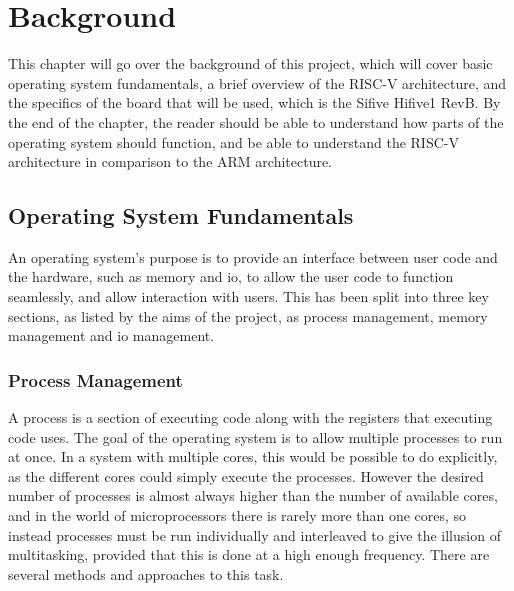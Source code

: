 \chapter[Background]{Background}
\label{cha:backgr}
This chapter will go over the background of this project, which will cover basic operating system fundamentals, a brief overview of the RISC-V architecture, and the specifics of the board that will be used, which is the Sifive Hifive1 RevB. By the end of the chapter, the reader should be able to understand how parts of the operating system should function, and be able to understand the RISC-V architecture in comparison to the ARM architecture.
\section{Operating System Fundamentals}
An operating system's purpose is to provide an interface between user code and the hardware, such as memory and \ac{io}, to allow the user code to function seamlessly, and allow interaction with users. This has been split into three key sections, as listed by the aims of the project, as process management, memory management and \ac{io} management\cite{modern_operating}.
\subsection{Process Management}
A process is a section of executing code along with the registers that executing code uses. The goal of the operating system is to allow multiple processes to run at once. In a system with multiple cores, this would be possible to do explicitly, as the different cores could simply execute the processes. However the desired number of processes is almost always higher than the number of available cores, and in the world of microprocessors there is rarely more than one cores, so instead processes must be run individually and interleaved to give the illusion of multitasking, provided that this is done at a high enough frequency. There are several methods and approaches to this task\cite{modern_operating}.
